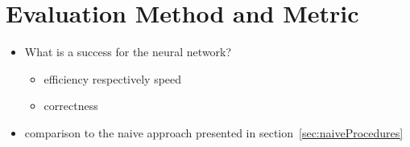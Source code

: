 \documentclass[a4paper]{article}
\begin{document}
\section{Evaluation Method and Metric}
\begin{itemize}
  \item What is a success for the neural network?
        \begin{itemize}[label=\(\rightarrow \)]
          \item efficiency respectively speed
          \item correctness
        \end{itemize}
  \item comparison to the naive approach presented in section~\ref{sec:naiveProcedures}
\end{itemize}
\end{document}
